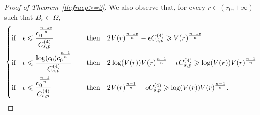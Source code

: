 \documentclass[12pt]{article}
\numberwithin{equation}{section}
\renewcommand{\leq}{\leqslant}
\renewcommand{\geq}{\geqslant}
\begin{document}
\begin{proof}[Proof of Theorem~\ref{th:fracp>=2}]
We also observe that, for every $r\in (r_0,+\infty)$ such that $B_r\subset \Omega$,
\begin{equation}\label{Lmadbur}
\begin{dcases}
\mbox{if}\quad \epsilon\leq  \frac{c_0^{\frac{n-sp}{n}}}{C_{s,p}^{(4)}}\quad &\mbox{then}\quad 2V(r)^{\frac{n-sp}{n}}-\epsilon C_{s,p}^{(4)}\geq V(r)^{\frac{n-sp}{n}}\\
\mbox{if}\quad  \epsilon\leq \frac{\log(c_0)c_0^{\frac{n-1}{n}}}{C_{s,p}^{(4)}}\quad &\mbox{then}\quad 2\log(V(r))V(r)^{\frac{n-1}{n}}-\epsilon C_{s,p}^{(4)}\geq \log(V(r))V(r)^{\frac{n-1}{n}}\\
\mbox{if}\quad \epsilon\leq \frac{c_0^\frac{n-1}{n}}{C_{s,p}^{(4)}} \quad &\mbox{then}\quad 2V(r)^{\frac{n-1}{n}}-\epsilon C_{s,p}^{(4)}\geq \log(V(r))V(r)^{\frac{n-1}{n}}. 
\end{dcases}
\end{equation}


\end{proof}
\end{document}
